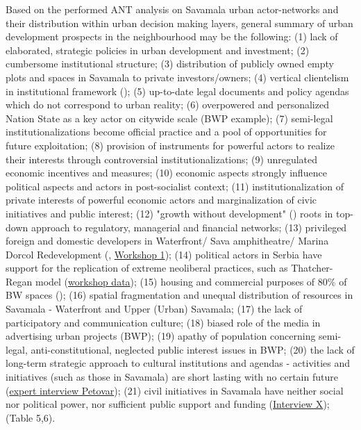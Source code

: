 \documentclass[11pt]{report}
\begin{document}
Based on the performed ANT analysis on Savamala urban actor-networks and their distribution within urban decision making layers, general summary of urban development prospects in the neighbourhood may be the following:
(1) lack of elaborated, strategic policies in urban development and investment;
(2) cumbersome institutional structure;
(3) distribution of publicly owned empty plots and spaces in Savamala to private investors/owners;
(4) vertical clientelism in institutional framework (\href{ref}{\citealt{vujovic_belgrades_2007}});
(5) up-to-date legal documents and policy agendas which do not correspond to urban reality;
(6) overpowered and personalized Nation State as a key actor on citywide scale (BWP example);
(7) semi-legal institutionalizations become official practice and a pool of opportunities for future exploitation;
(8) provision of instruments for powerful actors to realize their interests through controversial institutionalizations;
(9) unregulated economic incentives and measures;
(10) economic aspects strongly influence political aspects and actors in post-socialist context;
(11) institutionalization of private interests of powerful economic actors and marginalization of civic initiatives and public interest;
(12) "growth without development" (\cite{Vujosevic and Maricic, 2012}) roots in top-down approach to regulatory, managerial and financial networks;
(13) privileged foreign and domestic developers in Waterfront/ Sava amphitheatre/ Marina Dorcol Redevelopment (\href{ref}{\citealt{djordjevic_system_2009}}, \href{Expert Workshop}{Workshop 1});
(14) political actors in Serbia have support for the replication of extreme neoliberal practices, such as Thatcher-Regan model (\href{ref}{workshop data});
(15) housing and commercial purposes of 80\% of BW spaces (\href{ref}{\citealt{zekovic_megaprojects_2016}}); 
(16) spatial fragmentation and unequal distribution of resources in Savamala - Waterfront and Upper (Urban) Savamala;
(17) the lack of participatory and communication culture;
(18) biased role of the media in advertising urban projects (BWP);
(19) apathy of population concerning semi-legal, anti-constitutional, neglected public interest issues in BWP;
(20) the lack of long-term strategic approach to cultural institutions and agendas - activities and initiatives (such as those in Savamala) are short lasting with no certain future (\href{ref}{expert interview Petovar});
(21) civil initiatives in Savamala have neither social nor political power, nor sufficient public support and funding (\href{InterviewX}{Interview X});
(Table 5,6). 
\end{document}
